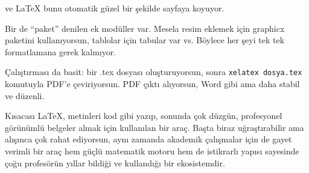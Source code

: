 ve LaTeX bunu otomatik güzel bir şekilde sayfaya koyuyor.

Bir de “paket” denilen ek modüller var. 
Mesela resim eklemek için graphicx paketini kullanıyorsun, 
tablolar için tabular var vs. Böylece her şeyi tek tek formatlamana gerek kalmıyor.

Çalıştırması da basit: bir .tex dosyası oluşturuyorsun, 
sonra \texttt{xelatex dosya.tex} komutuyla PDF’e çeviriyorsun. 
PDF çıktı alıyorsun, Word gibi ama daha stabil ve düzenli.

Kısacası LaTeX, metinleri kod gibi yazıp, 
sonunda çok düzgün, profesyonel görünümlü belgeler almak için kullanılan bir araç. 
Başta biraz uğraştırabilir ama alışınca çok rahat ediyorsun, aynı zamanda akademik 
çalışmalar için de gayet verimli bir araç hem güçlü matematik motoru hem de istikrarlı
yapısı sayesinde çoğu profesörün yıllar bildiği ve kullandığı bir ekosistemdir.
